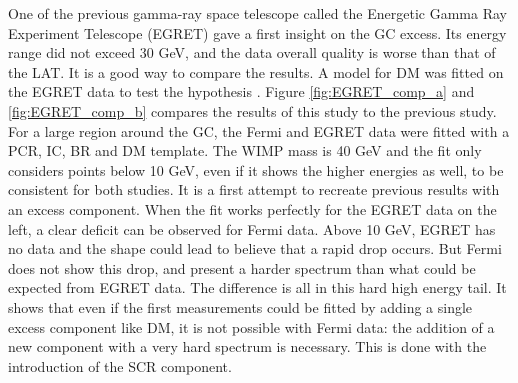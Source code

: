 One of the previous gamma-ray space telescope called the Energetic Gamma Ray Experiment Telescope (EGRET) \cite{Bertsch1989} gave a first insight on the GC excess. Its energy range did not exceed 30 GeV, and the data overall quality is worse than that of the LAT. It is a good way to compare the results. A model for DM was fitted on the EGRET data to test the hypothesis \cite{deBoer2006}. Figure \ref{fig:EGRET_comp_a} and \ref{fig:EGRET_comp_b} compares the results of this study to the previous study. For a large region around the GC, the Fermi and EGRET data were fitted with a PCR, IC, BR and DM template. The WIMP mass is 40 GeV and the fit only considers points below 10 GeV, even if it shows the higher energies as well, to be consistent for both studies. It is a first attempt to recreate previous results with an excess component.
When the fit works perfectly for the EGRET data on the left, a clear deficit can be observed for Fermi data. Above 10 GeV, EGRET has no data and the shape could lead to believe that a rapid drop occurs. But Fermi does not show this drop, and present a harder spectrum than what could be expected from EGRET data. The difference is all in this hard high energy tail. It shows that even if the first measurements could be fitted by adding a single excess component like DM, it is not possible with Fermi data: the addition of a new component with a very hard spectrum is necessary. This is done with the introduction of the SCR component.

